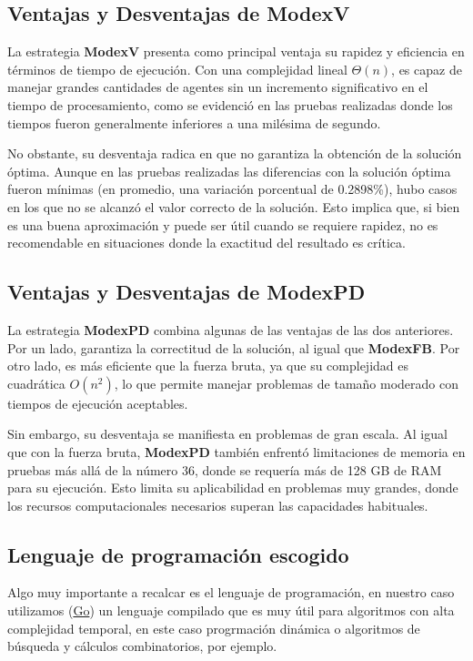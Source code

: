 \documentclass[letterpaper,10pt]{article}
\begin{document}
\subsection{Ventajas y Desventajas de ModexV}

La estrategia \textbf{ModexV} presenta como principal ventaja su rapidez y eficiencia en términos de tiempo de ejecución. Con una complejidad lineal $\Theta(n)$, es capaz de manejar grandes cantidades de agentes sin un incremento significativo en el tiempo de procesamiento, como se evidenció en las pruebas realizadas donde los tiempos fueron generalmente inferiores a una milésima de segundo.

No obstante, su desventaja radica en que no garantiza la obtención de la solución óptima. Aunque en las pruebas realizadas las diferencias con la solución óptima fueron mínimas (en promedio, una variación porcentual de 0.2898\%), hubo casos en los que no se alcanzó el valor correcto de la solución. Esto implica que, si bien es una buena aproximación y puede ser útil cuando se requiere rapidez, no es recomendable en situaciones donde la exactitud del resultado es crítica.

\subsection{Ventajas y Desventajas de ModexPD}

La estrategia \textbf{ModexPD} combina algunas de las ventajas de las dos anteriores. Por un lado, garantiza la correctitud de la solución, al igual que \textbf{ModexFB}. Por otro lado, es más eficiente que la fuerza bruta, ya que su complejidad es cuadrática $O(n^2)$, lo que permite manejar problemas de tamaño moderado con tiempos de ejecución aceptables.

Sin embargo, su desventaja se manifiesta en problemas de gran escala. Al igual que con la fuerza bruta, \textbf{ModexPD} también enfrentó limitaciones de memoria en pruebas más allá de la número 36, donde se requería más de 128 GB de RAM para su ejecución. Esto limita su aplicabilidad en problemas muy grandes, donde los recursos computacionales necesarios superan las capacidades habituales.
\subsection{Lenguaje de programación escogido}

Algo muy importante a recalcar es el lenguaje de programación, en nuestro caso utilizamos (\href{https://go.dev/}{Go}) un lenguaje compilado que es muy útil para algoritmos con alta complejidad temporal, en este caso progrmación dinámica o algoritmos de búsqueda y cálculos combinatorios, por ejemplo.
\end{document}
